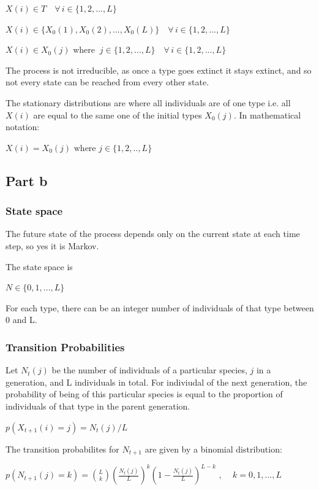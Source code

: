 \documentclass{article}
\begin{document}
$X(i) \in T \quad \forall \, i \in \{1,2,...,L\}$ 


$X(i) \in \{X_0(1), X_0(2), . . . , X_0(L)\} \quad \forall \, i \in \{1,2,...,L\}$ 

$X(i) \in X_0(j) \text{ where } \ j \in \{1,2,...,L\} \quad \forall \, i \in\{1,2,...,L\}$ 


The process is not irreducible, as once a type goes extinct it stays extinct, and so not every state can be reached from every other state.

The stationary distributions are where all individuals are of one type i.e. all $X(i)$ are equal to the same one of the initial types $X_0(j)$. In mathematical notation:

$ X(i) = X_0(j) \text{ where } j \in \{1,2,..,L\}$

\subsection{Part b}

\subsubsection{State space}

The future state of the process depends only on the current state at each time step, so yes it is Markov. 

The state space is 

$N \in \{0,1,...,L\} $ 

For each type, there can be an integer number of individuals of that type between 0 and L. 

\subsubsection{Transition Probabilities}

Let $N_t(j)$ be the number of individuals of a particular species, $j$ in a generation, and L individuals in total. For indiviudal of the next generation, the probability of being of this particular species is equal to the proportion of individuals of that type in the parent generation. 

$p(X_{t+1}(i) = j) = N_t(j)/L$

The transition probabilites for $N_{t+1}$ are given by a binomial distribution:

$p(N_{t+1}(j) = k) = {L \choose k}(\frac{N_t(j)}{L})^k(1-\frac{N_t(j)}{L})^{L-k} \text{ , } \quad k=0,1,...,L$
\end{document}
